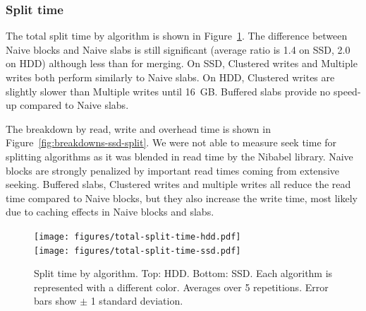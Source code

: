 \documentclass[10pt, conference, compsocconf]{IEEEtran}
\begin{document}
\subsubsection{Split time}

The total split time by algorithm is shown in
Figure~\ref{fig:split-time}. The difference between Naive blocks and
Naive slabs is still significant (average ratio is 1.4 on SSD, 2.0 on
HDD) although less than for merging. On SSD, Clustered writes and
Multiple writes both perform similarly to Naive slabs. On HDD,
Clustered writes are slightly slower than Multiple writes until
16~GB. Buffered slabs provide no speed-up compared
to Naive slabs.

The breakdown by read, write and overhead time is shown in
Figure~\ref{fig:breakdowns-ssd-split}. We were not able to measure
seek time for splitting algorithms as it was blended in read time by
the Nibabel library. Naive blocks are strongly penalized by important
read times coming from extensive seeking. Buffered slabs, Clustered
writes and multiple writes all reduce the read time compared to Naive
blocks, but they also increase the write time, most likely due to
caching effects in Naive blocks and slabs.

\begin{figure}[h]
  \centering
  \texttt{[image: figures/total-split-time-hdd.pdf]}\\
  \texttt{[image: figures/total-split-time-ssd.pdf]}
  \hfill
  \caption{Split time by algorithm. Top: HDD. Bottom: SSD. Each
    algorithm is represented with a different color. Averages over 5
    repetitions. Error bars show $\pm$ 1 standard deviation. }
\label{fig:split-time}
\end{figure}
\end{document}
